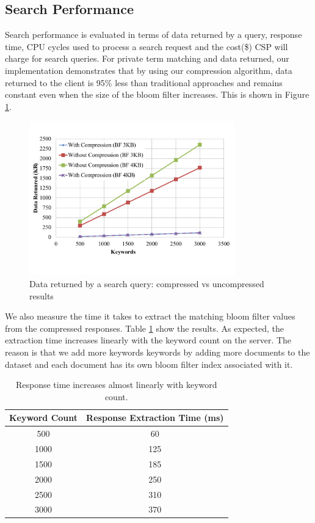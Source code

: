 \subsection{Search Performance}

Search performance is evaluated in terms of data returned by a query, response
time, CPU cycles used to process a search request and the cost(\$) CSP will
charge for search queries. 
For private term matching and data returned, our implementation demonstrates
that by using our compression algorithm, data returned to the client
is 95\% less than traditional approaches and remains constant even when the size
of the bloom filter increases. This is shown in Figure \ref{fig:compress}.

\begin{figure}[h!]
  \centering
  \includegraphics[width= 3.5in]{figures/comp_compare.png}
  \caption{Data returned by a search query: compressed vs uncompressed results}
  \label{fig:compress}
\end{figure}

We also measure the time it takes to extract the matching bloom filter values
from the compressed responses.
Table \ref{tab:search_response_time} show the results. As expected,
the extraction time increases linearly with the keyword count
on the server. The reason is that we add more keywords
keywords by adding more documents to the dataset and each document
has its own bloom filter index associated with it.

\begin{table}[th!]
\centering
\caption{Response time increases almost linearly with keyword count.}
\label{tab:search_response_time}
\begin{tabular}{| c | c | }
\hline
Keyword Count & Response Extraction Time (ms) \\
\hline
500  &  60 \\
1000 &  125 \\
1500 &  185 \\
2000 &  250 \\
2500 &  310 \\
3000 &  370 \\
\hline
\end{tabular}


\end{table}


